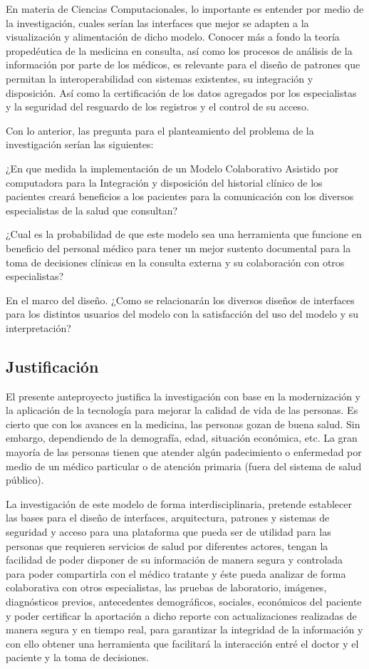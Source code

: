     En materia de Ciencias Computacionales, lo importante es entender por medio de la investigación, cuales serían las interfaces que mejor se adapten a la visualización y alimentación de dicho modelo. Conocer más a fondo la teoría propedéutica de la medicina en consulta, así como los procesos de análisis de la información por parte de los médicos, es relevante para el diseño de patrones que permitan la interoperabilidad con sistemas existentes, su integración y disposición. Así como la certificación de los datos agregados por los especialistas y la seguridad del resguardo de los registros y el control de su acceso.

    Con lo anterior, las pregunta para el planteamiento del problema de la investigación serían las siguientes:

    ¿En que medida la implementación de un Modelo Colaborativo Asistido por computadora para la Integración y disposición del historial clínico de los pacientes creará beneficios a los pacientes para la comunicación con los diversos especialistas de la salud que consultan?

    ¿Cual es la probabilidad de que este modelo sea una herramienta que funcione en beneficio del personal médico para tener un mejor sustento documental para la toma de decisiones clínicas en la consulta externa y su colaboración con otros especialistas?

    En el marco del diseño. ¿Como se relacionarán los diversos diseños de interfaces para los distintos usuarios del modelo con la satisfacción del uso del modelo y su interpretación?
    \subsection{Justificación}
    El presente anteproyecto justifica la investigación con base en la modernización y la aplicación de la tecnología para mejorar la calidad de vida de las personas. Es cierto que con los avances en la medicina, las personas gozan de buena salud. Sin embargo, dependiendo de la demografía, edad, situación económica, etc. La gran mayoría de las personas tienen que atender algún padecimiento o enfermedad por medio de un médico particular o de atención primaria (fuera del sistema de salud público).
    
    La investigación de este modelo de forma interdisciplinaria, pretende establecer las bases para el diseño de interfaces, arquitectura, patrones y sistemas de seguridad y acceso para una plataforma que pueda ser de utilidad para las personas que requieren servicios de salud por diferentes actores, tengan la facilidad de poder disponer de su información de manera segura y controlada para poder compartirla con el médico tratante y éste pueda analizar de forma colaborativa con otros especialistas, las pruebas de laboratorio, imágenes, diagnósticos previos, antecedentes demográficos, sociales, económicos del paciente y poder certificar la aportación a dicho reporte con actualizaciones realizadas de manera segura y en tiempo real, para garantizar la integridad de la información y con ello obtener una herramienta que facilitará la interacción entré el doctor y el paciente y la toma de decisiones.
